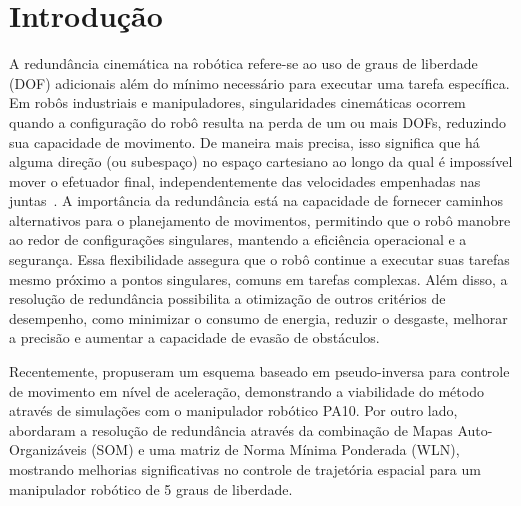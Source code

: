 \chapter{Introdução}\label{cap:introduction}

A redundância cinemática na robótica refere-se ao uso de graus de liberdade (DOF) adicionais além do mínimo necessário para executar uma
tarefa específica. Em robôs industriais e manipuladores, singularidades cinemáticas ocorrem quando a configuração do robô resulta na perda de um ou mais DOFs, 
reduzindo sua capacidade de movimento. De maneira mais precisa, isso significa que há alguma direção (ou subespaço) no espaço cartesiano ao longo da qual é 
impossível mover o efetuador final, independentemente das velocidades empenhadas nas juntas~\cite{craig2004}. A importância da redundância está na capacidade de 
fornecer caminhos alternativos para o planejamento de movimentos, permitindo que o robô manobre ao redor de configurações singulares, mantendo a eficiência 
operacional e a segurança. Essa flexibilidade assegura que o robô continue a executar suas tarefas mesmo próximo a pontos singulares, comuns em tarefas complexas. Além disso, a resolução
de redundância possibilita a otimização de outros critérios de desempenho, como minimizar o consumo de energia, reduzir o desgaste, melhorar a precisão e
aumentar a capacidade de evasão de obstáculos.

Recentemente, \cite{li2023pseudo} propuseram um esquema baseado em pseudo-inversa para controle de movimento em nível de aceleração,
demonstrando a viabilidade do método através de simulações com o manipulador robótico PA10. Por outro lado, \cite{kuri2023som}
abordaram a resolução de redundância através da combinação de Mapas Auto-Organizáveis (SOM) e uma matriz de Norma Mínima Ponderada
(WLN), mostrando melhorias significativas no controle de trajetória espacial para um manipulador robótico de 5 graus de liberdade.


